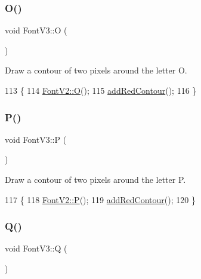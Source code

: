 \subsubsection{\texorpdfstring{O()}{O()}}
{\footnotesize\ttfamily void Font\+V3\+::O (\begin{DoxyParamCaption}{ }\end{DoxyParamCaption})}



Draw a contour of two pixels around the letter O. 


\begin{DoxyCode}
113                \{
114     \mbox{\hyperlink{class_font_v2_afb1d85a50e3982f0f1e77d5e1ca7f53c}{FontV2::O}}();
115     \mbox{\hyperlink{class_font_v3_a639f1eac0eb6724463813270f47e2696}{addRedContour}}();
116 \}
\end{DoxyCode}
\mbox{\label{class_font_v3_a0996f6439985cf592decdde1174a7c56}} 
\subsubsection{\texorpdfstring{P()}{P()}}
{\footnotesize\ttfamily void Font\+V3\+::P (\begin{DoxyParamCaption}{ }\end{DoxyParamCaption})}



Draw a contour of two pixels around the letter P. 


\begin{DoxyCode}
117                \{
118     \mbox{\hyperlink{class_font_v2_ab47b245b84ea5c1dd89055c83b6ea052}{FontV2::P}}();
119     \mbox{\hyperlink{class_font_v3_a639f1eac0eb6724463813270f47e2696}{addRedContour}}();
120 \}
\end{DoxyCode}
\mbox{\label{class_font_v3_af6a1481c838fb835e0fecd8d13bf8781}} 
\subsubsection{\texorpdfstring{Q()}{Q()}}
{\footnotesize\ttfamily void Font\+V3\+::Q (\begin{DoxyParamCaption}{ }\end{DoxyParamCaption})}



